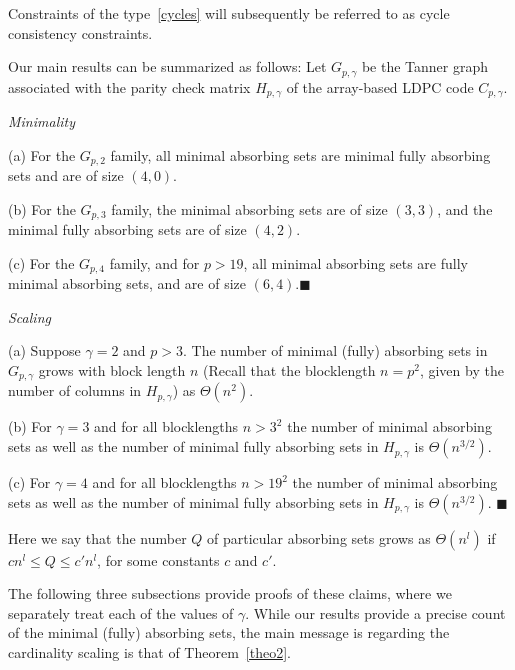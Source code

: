 Constraints of the type~\eqref{cycles} will subsequently be referred
to as cycle consistency constraints.


Our main results can be summarized as follows: Let $G_{p,\gamma}$
be the Tanner graph associated with the parity check matrix
$H_{p,\gamma}$ of the array-based LDPC code $C_{p,\gamma}$.
\begin{theorem}\label{theo1}\emph{Minimality}

(a) For the $G_{p,2}$ family, all minimal absorbing sets are
minimal fully absorbing sets and are of size $(4,0)$.

(b) For the $G_{p,3}$ family, the minimal absorbing sets are of
size $(3,3)$, and the minimal fully absorbing sets are of size
$(4,2)$.

(c) For the $G_{p,4}$ family, and for $p>19$, all minimal absorbing
sets are fully minimal absorbing sets, and are of size
$(6,4)$.\hfill$\blacksquare$
\end{theorem}
\begin{theorem}\label{theo2}\emph{Scaling}

(a) Suppose $\gamma=2$ and $p>3$. The number of minimal (fully)
absorbing sets in $G_{p,\gamma}$ grows with block length $n$ (Recall
that the blocklength $n=p^2$, given by the number of columns in
$H_{p,\gamma}$) as $\Theta(n^{2})$.

(b) For $\gamma=3$ and for all blocklengths $n>3^2$ the number of
minimal absorbing sets as well as the number of minimal fully
absorbing sets in $H_{p,\gamma}$ is $\Theta(n^{3/2})$.

(c) For $\gamma=4$ and for all blocklengths $n>19^2$ the number of
minimal absorbing sets as well as the number of minimal fully
absorbing sets in $H_{p,\gamma}$ is $\Theta(n^{3/2})$.
\hfill$\blacksquare$
\end{theorem}




Here we say that the number $Q$ of particular absorbing sets  grows
as $\Theta(n^l)$ if $cn^l \leq Q \leq c'n^l$, for some constants $c$
and $c'$.

The following three subsections provide proofs of these claims,
where we separately treat each of the values of $\gamma$. While our
results provide a precise count of the minimal (fully) absorbing
sets, the main message is regarding the cardinality scaling is that
of Theorem~\ref{theo2}.


